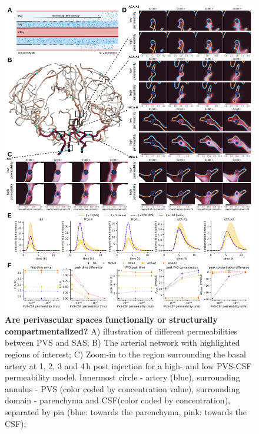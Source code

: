 \documentclass[fleqn,10pt]{wlscirep}
\begin{document}


\begin{figure}
    \centering
    \includegraphics[width=0.95 \textwidth]{figures/figure4.png}
    \caption{\textbf{Are perivascular spaces functionally or structurally compartmentalized?}
    A) illustration of different permeabilities between PVS and SAS; 
    B) The arterial network with highlighted regions of interest; 
    C) Zoom-in to the region surrounding the basal artery at 1, 2, 3 and 4\,h post injection for a high- and low PVS-CSF permeability model. Innermost circle - artery (blue), surrounding annulus - PVS (color coded by concentration value), surrounding domain - parenchyma and CSF(color coded by concentration), separated by pia (blue: towards the parenchyma, pink: towards the CSF); 
}
\end{figure}
\end{document}
